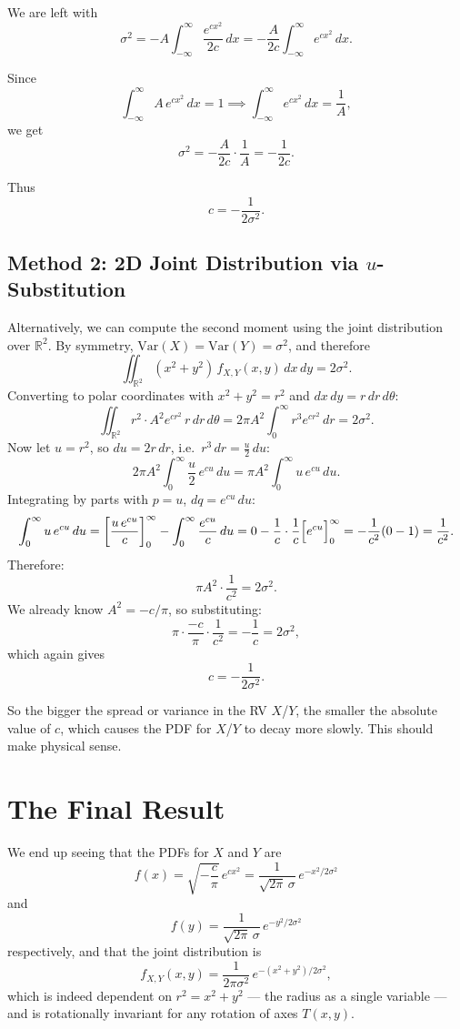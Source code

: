 \documentclass[12pt]{article}
\begin{document}
We are left with
\[
    \sigma^2 = -A\int_{-\infty}^{\infty} \frac{e^{cx^2}}{2c}\,dx = -\frac{A}{2c}\int_{-\infty}^{\infty} e^{cx^2}\,dx.
\]
 
Since
\[
    \int_{-\infty}^{\infty} A\,e^{cx^2}\,dx = 1 \implies \int_{-\infty}^{\infty} e^{cx^2}\,dx = \frac{1}{A},
\]
we get
\[
    \sigma^2 = -\frac{A}{2c} \cdot \frac{1}{A} = -\frac{1}{2c}.
\]
 
Thus
\[
    \boxed{c = -\frac{1}{2\sigma^2}}.
\]
 
\subsection*{Method 2: 2D Joint Distribution via $u$-Substitution}
 
Alternatively, we can compute the second moment using the joint distribution over $\mathbb{R}^2$. By symmetry, $\text{Var}(X) = \text{Var}(Y) = \sigma^2$, and therefore
\[
    \iint_{\mathbb{R}^2} (x^2 + y^2)\, f_{X,Y}(x,y)\,dx\,dy = 2\sigma^2.
\]
Converting to polar coordinates with $x^2 + y^2 = r^2$ and $dx\,dy = r\,dr\,d\theta$:
\[
    \iint_{\mathbb{R}^2} r^2 \cdot A^2 e^{cr^2}\, r\,dr\,d\theta
    = 2\pi A^2 \int_0^{\infty} r^3 e^{cr^2}\,dr = 2\sigma^2.
\]
Now let $u = r^2$, so $du = 2r\,dr$, i.e.\ $r^3\,dr = \tfrac{u}{2}\,du$:
\[
    2\pi A^2 \int_0^{\infty} \frac{u}{2}\,e^{cu}\,du = \pi A^2 \int_0^{\infty} u\,e^{cu}\,du.
\]
Integrating by parts with $p = u$, $dq = e^{cu}\,du$:
\[
    \int_0^{\infty} u\, e^{cu}\,du = \left[\frac{u\,e^{cu}}{c}\right]_0^{\infty} - \int_0^{\infty} \frac{e^{cu}}{c}\,du = 0 - \frac{1}{c}\cdot\frac{1}{c}\Bigl[e^{cu}\Bigr]_0^{\infty} = -\frac{1}{c^2}(0-1) = \frac{1}{c^2}.
\]
Therefore:
\[
    \pi A^2 \cdot \frac{1}{c^2} = 2\sigma^2.
\]
We already know $A^2 = -c/\pi$, so substituting:
\[
    \pi \cdot \frac{-c}{\pi} \cdot \frac{1}{c^2} = -\frac{1}{c} = 2\sigma^2,
\]
which again gives
\[
    \boxed{c = -\frac{1}{2\sigma^2}}.
\]
 
\medskip
So the bigger the spread or variance in the RV $X$/$Y$, the smaller the absolute value of $c$, which causes the PDF for $X$/$Y$ to decay more slowly. This should make physical sense.
 
\section*{The Final Result}
 
We end up seeing that the PDFs for $X$ and $Y$ are
\[
    f(x) = \sqrt{-\frac{c}{\pi}}\,e^{cx^2} = \frac{1}{\sqrt{2\pi}\,\sigma}\,e^{-x^2/2\sigma^2}
\]
and
\[
    f(y) = \frac{1}{\sqrt{2\pi}\,\sigma}\,e^{-y^2/2\sigma^2}
\]
respectively, and that the joint distribution is
\[
    f_{X,Y}(x,y) = \frac{1}{2\pi\sigma^2}\,e^{-(x^2+y^2)/2\sigma^2},
\]
which is indeed dependent on $r^2 = x^2 + y^2$ --- the radius as a single variable --- and is rotationally invariant for any rotation of axes $T(x,y)$.
 
\end{document}
